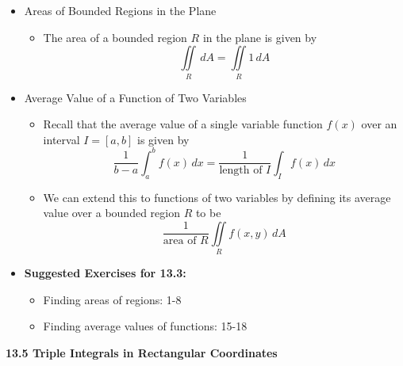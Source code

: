\documentclass[12pt]{article}
\theoremstyle{plain}
\theoremstyle{definition}
\theoremstyle{remark}
\begin{document}
	\begin{itemize}
	
	\item Areas of Bounded Regions in the Plane
		
		\begin{itemize}
		\item The area of a bounded region $R$ in the plane is given by \[\iint\limits_R\,dA=\iint\limits_R 1\,dA\]
		\end{itemize}
		
	\item Average Value of a Function of Two Variables
	
		\begin{itemize}
		\item Recall that the average value of a single variable function $f(x)$ over an interval $I=[a,b]$ is given by \[\frac{1}{b-a}\int_a^b f(x) \,dx = \frac{1}{\textrm{length of }I}\int_I f(x)\,dx\]
		\item We can extend this to functions of two variables by defining its average value over a bounded region $R$ to be \[\frac{1}{\textrm{area of }R}\iint\limits_R f(x,y)\,dA\]
		\end{itemize}
		
	\item \textbf{Suggested Exercises for 13.3:}
	
		\begin{itemize}
		\item Finding areas of regions: 1-8
		\item Finding average values of functions: 15-18
		\end{itemize}
		
	\end{itemize}
	
	\newpage
	
	\centerline{\bf 13.5 Triple Integrals in Rectangular Coordinates}
	
\end{document}
